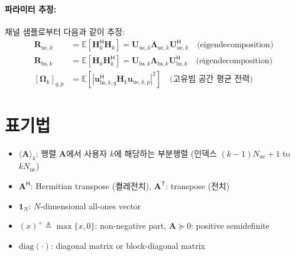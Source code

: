 \documentclass[10pt]{article}
\begin{document}
\paragraph{파라미터 추정:} 채널 샘플로부터 다음과 같이 추정:
\begin{align*}
\mathbf{R}_{\text{ue},k} &= \mathbb{E}[\mathbf{H}_k^{\mathsf{H}} \mathbf{H}_k] = \mathbf{U}_{\text{ue},k} \mathbf{\Lambda}_{\text{ue},k} \mathbf{U}_{\text{ue},k}^{\mathsf{H}} \quad \text{(eigendecomposition)} \\
\mathbf{R}_{\text{bs},k} &= \mathbb{E}[\mathbf{H}_k \mathbf{H}_k^{\mathsf{H}}] = \mathbf{U}_{\text{bs},k} \mathbf{\Lambda}_{\text{bs},k} \mathbf{U}_{\text{bs},k}^{\mathsf{H}} \quad \text{(eigendecomposition)} \\
[\boldsymbol{\Omega}_k]_{q,p} &= \mathbb{E}[|\mathbf{u}_{\text{bs},k,q}^{\mathsf{H}} \mathbf{H}_k \mathbf{u}_{\text{ue},k,p}|^2] \quad \text{(고유빔 공간 평균 전력)}
\end{align*}

\section*{표기법}

\begin{itemize}
\item $\langle \mathbf{A} \rangle_k$: 행렬 $\mathbf{A}$에서 사용자 $k$에 해당하는 부분행렬 (인덱스 $(k-1)N_{\text{ue}} + 1$ to $k N_{\text{ue}}$)
\item $\mathbf{A}^{\mathsf{H}}$: Hermitian transpose (켤레전치), $\mathbf{A}^{\mathsf{T}}$: transpose (전치)
\item $\mathbf{1}_N$: $N$-dimensional all-ones vector
\item $(x)^+ \triangleq \max\{x, 0\}$: non-negative part, $\mathbf{A} \succeq 0$: positive semidefinite
\item $\mathrm{diag}(\cdot)$: diagonal matrix or block-diagonal matrix
\end{itemize}
\end{document}
